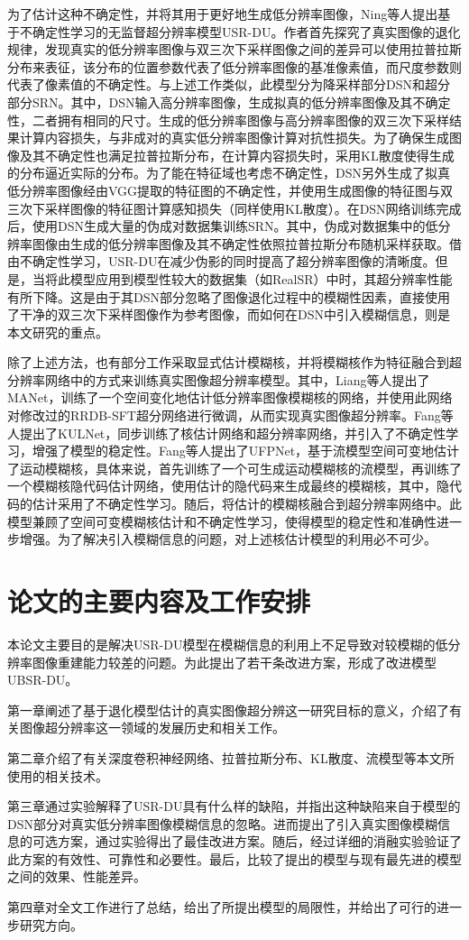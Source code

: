 为了估计这种不确定性，并将其用于更好地生成低分辨率图像，Ning等人提出基于不确定性学习的无监督超分辨率模型USR-DU。作者首先探究了真实图像的退化规律，发现真实的低分辨率图像与双三次下采样图像之间的差异可以使用拉普拉斯分布来表征，该分布的位置参数代表了低分辨率图像的基准像素值，而尺度参数则代表了像素值的不确定性。与上述工作类似，此模型分为降采样部分DSN和超分部分SRN。其中，DSN输入高分辨率图像，生成拟真的低分辨率图像及其不确定性，二者拥有相同的尺寸。生成的低分辨率图像与高分辨率图像的双三次下采样结果计算内容损失，与非成对的真实低分辨率图像计算对抗性损失。为了确保生成图像及其不确定性也满足拉普拉斯分布，在计算内容损失时，采用KL散度使得生成的分布逼近实际的分布。为了能在特征域也考虑不确定性，DSN另外生成了拟真低分辨率图像经由VGG提取的特征图的不确定性，并使用生成图像的特征图与双三次下采样图像的特征图计算感知损失（同样使用KL散度）。在DSN网络训练完成后，使用DSN生成大量的伪成对数据集训练SRN。其中，伪成对数据集中的低分辨率图像由生成的低分辨率图像及其不确定性依照拉普拉斯分布随机采样获取。借由不确定性学习，USR-DU在减少伪影的同时提高了超分辨率图像的清晰度。但是，当将此模型应用到模型性较大的数据集（如RealSR）中时，其超分辨率性能有所下降。这是由于其DSN部分忽略了图像退化过程中的模糊性因素，直接使用了干净的双三次下采样图像作为参考图像，而如何在DSN中引入模糊信息，则是本文研究的重点。


除了上述方法，也有部分工作采取显式估计模糊核，并将模糊核作为特征融合到超分辨率网络中的方式来训练真实图像超分辨率模型。其中，Liang等人提出了MANet，训练了一个空间变化地估计低分辨率图像模糊核的网络，并使用此网络对修改过的RRDB-SFT超分网络进行微调，从而实现真实图像超分辨率。Fang等人提出了KULNet，同步训练了核估计网络和超分辨率网络，并引入了不确定性学习，增强了模型的稳定性。Fang等人提出了UFPNet，基于流模型空间可变地估计了运动模糊核，具体来说，首先训练了一个可生成运动模糊核的流模型，再训练了一个模糊核隐代码估计网络，使用估计的隐代码来生成最终的模糊核，其中，隐代码的估计采用了不确定性学习。随后，将估计的模糊核融合到超分辨率网络中。此模型兼顾了空间可变模糊核估计和不确定性学习，使得模型的稳定性和准确性进一步增强。为了解决引入模糊信息的问题，对上述核估计模型的利用必不可少。

\section{论文的主要内容及工作安排}
本论文主要目的是解决USR-DU模型在模糊信息的利用上不足导致对较模糊的低分辨率图像重建能力较差的问题。为此提出了若干条改进方案，形成了改进模型UBSR-DU。

第一章阐述了基于退化模型估计的真实图像超分辨这一研究目标的意义，介绍了有关图像超分辨率这一领域的发展历史和相关工作。

第二章介绍了有关深度卷积神经网络、拉普拉斯分布、KL散度、流模型等本文所使用的相关技术。

第三章通过实验解释了USR-DU具有什么样的缺陷，并指出这种缺陷来自于模型的DSN部分对真实低分辨率图像模糊信息的忽略。进而提出了引入真实图像模糊信息的可选方案，通过实验得出了最佳改进方案。随后，经过详细的消融实验验证了此方案的有效性、可靠性和必要性。最后，比较了提出的模型与现有最先进的模型之间的效果、性能差异。

第四章对全文工作进行了总结，给出了所提出模型的局限性，并给出了可行的进一步研究方向。
